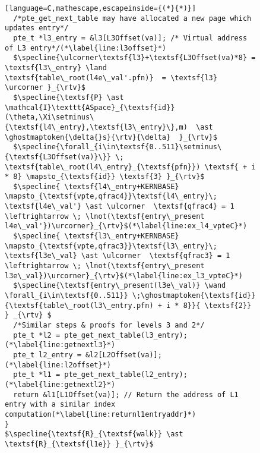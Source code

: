 \begin{figure}
\begin{lstlisting}[language=C,mathescape,escapeinside={(*}{*)}]
  /*pte_get_next_table may have allocated a new page which updates entry*/
  pte_t *l3_entry = &l3[L3Offset(va)]; /* Virtual address of L3 entry*/(*\label{line:l3offset}*)
  $\specline{\ulcorner\textsf{l3}+\textsf{L3Offset(va)*8} = \textsf{l3\_entry} \land \textsf{table\_root(l4e\_val'.pfn)}  = \textsf{l3} \urcorner }_{\rtv}$
  $\specline{\textsf{P} \ast \mathcal{I}\texttt{ASpace}_{\textsf{id}}(\theta,\Xi\setminus\{\textsf{l4\_entry},\textsf{l3\_entry}\},m)  \ast \ghostmaptoken{\delta{}s}{\rtv}{\delta}  }_{\rtv}$
  $\specline{\forall_{i\in\textsf{0..511}\setminus\{\textsf{L3Offset(va)}\}} \; \textsf{table\_root(l4\_entry}_{\textsf{pfn}}) \textsf{ + i * 8} \mapsto_{\textsf{id}} \textsf{3} }_{\rtv}$
  $\specline{ \textsf{l4\_entry+KERNBASE} \mapsto_{\textsf{vpte,qfrac4}}\textsf{l4\_entry}\; \textsf{l4e\_val'} \ast \ulcorner  \textsf{qfrac4} = 1 \leftrightarrow \; \lnot(\textsf{entry\_present l4e\_val'})\urcorner}_{\rtv}$(*\label{line:ex_l4_vpteC}*)
  $\specline{ \textsf{l3\_entry+KERNBASE} \mapsto_{\textsf{vpte,qfrac3}}\textsf{l3\_entry}\; \textsf{l3e\_val} \ast \ulcorner  \textsf{qfrac3} = 1 \leftrightarrow \; \lnot(\textsf{entry\_present l3e\_val})\urcorner}_{\rtv}$(*\label{line:ex_l3_vpteC}*)
  $\specline{\textsf{entry\_present(l3e\_val)} \wand \forall_{i\in\textsf{0..511}} \;\ghostmaptoken{\textsf{id}}{\textsf{table\_root(l3\_entry.pfn) + i * 8}}{ \textsf{2}} } _{\rtv} $
  /*Similar steps & proofs for levels 3 and 2*/
  pte_t *l2 = pte_get_next_table(l3_entry);(*\label{line:getnextl3}*)
  pte_t l2_entry = &l2[L2Offset(va)];(*\label{line:l2offset}*)
  pte_t *l1 = pte_get_next_table(l2_entry);(*\label{line:getnextl2}*)
  return &l1[L1Offset(va)]; // Return the address of L1 entry with a similar index computation(*\label{line:returnl1entryaddr}*)
}
$\specline{\textsf{R}_{\textsf{walk}} \ast \textsf{R}_{\textsf{l1e}} }_{\rtv}$
\end{lstlisting}


\end{figure}
